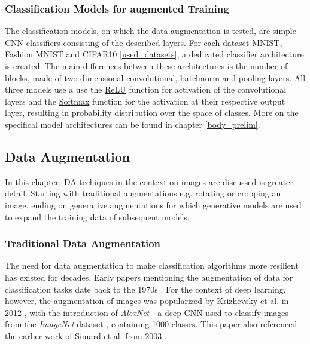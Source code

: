 \subsubsection{Classification Models for augmented Training}
The classification models, on which the data augmentation is tested, are simple CNN classifiers consisting of the described layers. For each dataset MNIST, Fashion MNIST and CIFAR10 \ref{used_datasets}, a dedicated classifier architecture is created. The main differences between these architectures is the number of blocks, made of two-dimensional \hyperref[theoretical_classification_conv_layers]{convolutional}, \hyperref[theoretical_classification_batchnorm_layers]{batchnorm} and \hyperref[theoretical_classification_pooling_layers]{pooling} layers. All three models use a use the \hyperref[theoretical_activations_relu]{ReLU} function for activation of the convolutional layers and the \hyperref[theoretical_activations_softmax]{Softmax} function for the activation at their respective output layer, resulting in probability distribution over the space of classes. More on the specifical model architectures can be found in chapter \ref{body_prelim}. %


\subsection[Data Augmentation - DA]{Data Augmentation}\label{theoretical_da}
In this chapter, DA techiques in the context on images are discussed is greater detail. Starting with traditional augmentations e.g. rotating or cropping an image, ending on generative augmentations for which generative models are used to expand the training data of subsequent models.

\subsubsection[Traditional Data Augmentation - TDA]{Traditional Data Augmentation}\label{theoretical_tda}
The need for data augmentation to make classification algorithms more resilient has existed for decades. Early papers mentioning the augmentation of data for classification tasks date back to the 1970s \cite{Nagy1966}. For the context of deep learning, however, the augmentation of images was popularized by Krizhevsky et al. in 2012 \cite{Krizhevsky2012traditionaldataaugmentation}, with the introduction of \textit{AlexNet}—a deep CNN used to classify images from the \textit{ImageNet} dataset \cite{ImageNetDataset5206848}, containing 1000 classes. This paper also referenced the earlier work of Simard et al. from 2003 \cite{Simard2003bestpracticesforcnns}.

